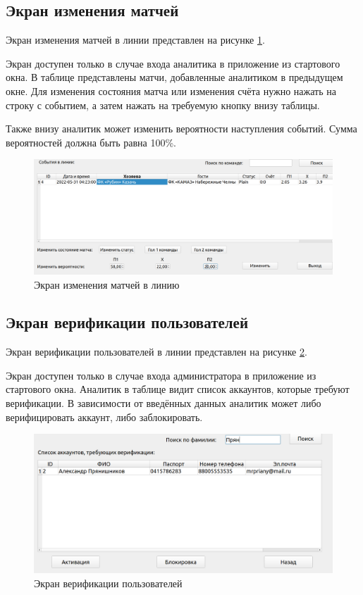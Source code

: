 \subsection{Экран изменения матчей}
Экран изменения матчей в линии представлен на рисунке \ref{fig::change}.

Экран доступен только в случае входа аналитика в приложение из стартового окна.
В таблице представлены матчи, добавленные аналитиком в предыдущем окне.
Для изменения состояния матча или изменения счёта нужно нажать на строку с событием, а затем нажать на требуемую кнопку внизу таблицы.

Также внизу аналитик может изменить вероятности наступления событий. 
Сумма вероятностей должна быть равна 100\%.

\FloatBarrier
\begin{figure}[hp]	
	\begin{center}
		\includegraphics[width=\linewidth]{inc/matches.png}
	\end{center}
	\caption{Экран изменения матчей в линию}
	\label{fig::change}
\end{figure}
\FloatBarrier

\subsection{Экран верификации пользователей}
Экран верификации пользователей в линии представлен на рисунке \ref{fig::verify}.

Экран доступен только в случае входа администратора в приложение из стартового окна.
Аналитик в таблице видит список аккаунтов, которые требуют верификации.
В зависимости от введённых данных аналитик может либо верифицировать аккаунт, либо заблокировать.

\FloatBarrier
\begin{figure}[hp]	
	\begin{center}
		\includegraphics[width=\linewidth]{inc/verify.png}
	\end{center}
	\caption{Экран верификации пользователей}
	\label{fig::verify}
\end{figure}
\FloatBarrier